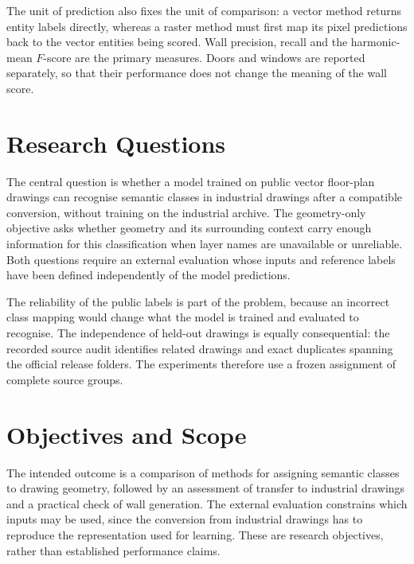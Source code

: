 The unit of prediction also fixes the unit of comparison: a vector method returns
entity labels directly, whereas a raster method must first map its pixel
predictions back to the vector entities being scored.
Wall precision, recall and the harmonic-mean \(F\)-score are the primary measures.
Doors and windows are reported separately, so that their performance does not
change the meaning of the wall score.

\section{Research Questions}
\label{sec:research-questions}
The central question is whether a model trained on public vector floor-plan
drawings can recognise semantic classes in industrial drawings after a compatible
conversion, without training on the industrial archive.
The geometry-only objective asks whether geometry and its surrounding context
carry enough information for this classification when layer names are unavailable
or unreliable.
Both questions require an external evaluation whose inputs and reference labels
have been defined independently of the model predictions.

The reliability of the public labels is part of the problem, because an incorrect
class mapping would change what the model is trained and evaluated to recognise.
The independence of held-out drawings is equally consequential: the recorded
source audit identifies related drawings and exact duplicates spanning the
official release folders.
The experiments therefore use a frozen assignment of complete source groups.

\section{Objectives and Scope}
\label{sec:objectives}
The intended outcome is a comparison of methods for assigning semantic classes to
drawing geometry, followed by an assessment of transfer to industrial drawings
and a practical check of wall generation.
The external evaluation constrains which inputs may be used, since the conversion
from industrial drawings has to reproduce the representation used for learning.
These are research objectives, rather than established performance claims.

